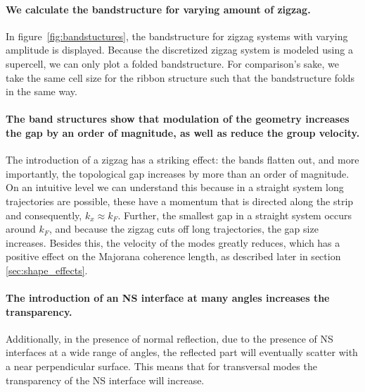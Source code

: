 \documentclass[english, twocolumn, 10pt, aps, superscriptaddress, floatfix, prb, citeautoscript]{revtex4-1}
\renewcommand{\comment}[2]{#2}
\renewcommand{\comment}{\paragraph}
\begin{document}
\comment{We calculate the bandstructure for varying amount of zigzag.}
In figure~\ref{fig:bandstuctures}, the bandstructure for zigzag systems with varying amplitude is displayed.
Because the discretized zigzag system is modeled using a supercell, we can only plot a folded bandstructure.
For comparison's sake, we take the same cell size for the ribbon structure such that the bandstructure folds in the same way.

\comment{The band structures show that modulation of the geometry increases the gap by an order of magnitude, as well as reduce the group velocity.}
The introduction of a zigzag has a striking effect: the bands flatten out, and more importantly, the topological gap increases by more than an order of magnitude.
On an intuitive level we can understand this because in a straight system long trajectories are possible, these have a momentum that is directed along the strip and consequently, $k_x \approx k_F$.
Further, the smallest gap in a straight system occurs around $k_F$, and because the zigzag cuts off long trajectories, the gap size increases.
Besides this, the velocity of the modes greatly reduces, which has a positive effect on the Majorana coherence length, as described later in section \ref{sec:shape_effects}.

\comment{The introduction of an NS interface at many angles increases the transparency.}
Additionally, in the presence of normal reflection, due to the presence of NS interfaces at a wide range of angles, the reflected part will eventually scatter with a near perpendicular surface.
This means that for transversal modes the transparency of the NS interface will increase.



\end{document}
